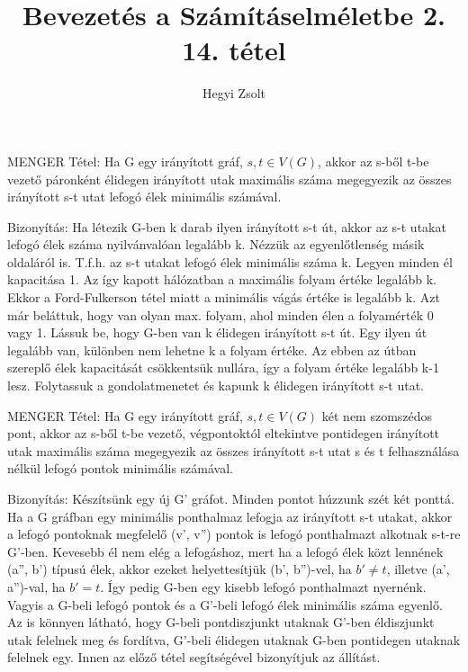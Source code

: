 \documentclass[]{article}
\title{Bevezetés a Számításelméletbe 2.\\{\large 14. tétel}}
\author{Hegyi Zsolt}
\begin{document}
\maketitle
\begin{framed}
MENGER Tétel: Ha G egy irányított gráf, $s,t\in V(G)$, akkor az s-ből t-be vezető páronként élidegen irányított utak maximális száma megegyezik az összes irányított s-t utat lefogó élek minimális számával.
\end{framed}
\begin{leftbar}
Bizonyítás: Ha létezik G-ben k darab ilyen irányított s-t út, akkor az s-t utakat lefogó élek száma nyilvánvalóan legalább k. Nézzük az egyenlőtlenség másik oldaláról is. T.f.h. az s-t utakat lefogó élek minimális száma k. Legyen minden él kapacitása 1. Az így kapott hálózatban a maximális folyam értéke legalább k. Ekkor a Ford-Fulkerson tétel miatt a minimális vágás értéke is legalább k. Azt már beláttuk, hogy van olyan max. folyam, ahol minden élen a folyamérték 0 vagy 1. Lássuk be, hogy G-ben van k élidegen irányított s-t út. Egy ilyen út legalább van, különben nem lehetne k a folyam értéke. Az ebben az útban szereplő élek kapacitását csökkentsük nullára, így a folyam értéke legalább k-1 lesz. Folytassuk a gondolatmenetet és kapunk k élidegen irányított s-t utat.
\end{leftbar}
\begin{framed}
MENGER Tétel: Ha G egy irányított gráf, $s,t\in V(G)$ két nem szomszédos pont, akkor az s-ből t-be vezető, végpontoktól eltekintve pontidegen irányított utak maximális száma megegyezik az összes irányított s-t utat s és t felhasználása nélkül lefogó pontok minimális számával.
\end{framed}
\begin{leftbar}
Bizonyítás: Készítsünk egy új G' gráfot. Minden pontot húzzunk szét két ponttá. Ha a G gráfban egy minimális ponthalmaz lefogja az irányított s-t utakat, akkor a lefogó pontoknak megfelelő (v', v'') pontok is lefogó ponthalmazt alkotnak s-t-re G'-ben. Kevesebb él nem elég a lefogáshoz, mert ha a lefogó élek közt lennének (a'', b') típusú élek, akkor ezeket helyettesítjük (b', b'')-vel, ha $b' \neq t$, illetve (a', a'')-val, ha $b' = t$. Így pedig G-ben egy kisebb lefogó ponthalmazt nyernénk. Vagyis a G-beli lefogó pontok és a G'-beli lefogó élek minimális száma egyenlő. Az is könnyen látható, hogy G-beli pontdiszjunkt utaknak G'-ben éldiszjunkt utak felelnek meg és fordítva, G'-beli élidegen utaknak G-ben pontidegen utaknak felelnek egy. Innen az előző tétel segítségével bizonyítjuk az állítást.
\end{leftbar}
\end{document}
